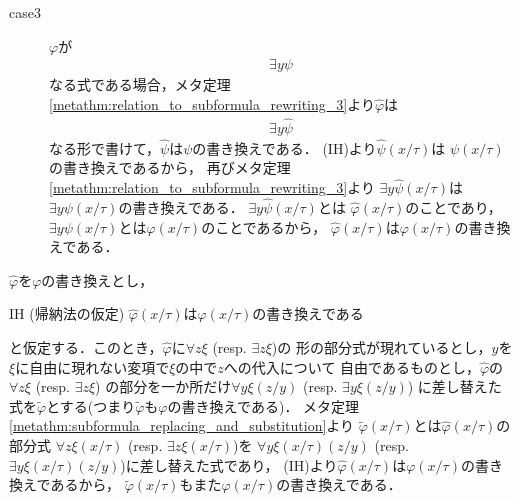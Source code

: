 \begin{metaprf}[第一]
\begin{description}
\begin{description}
					\item[case3] $\varphi$が
						\begin{align}
							\exists y \psi
						\end{align}
						なる式である場合，メタ定理\ref{metathm:relation_to_subformula_rewriting_3}より$\widehat{\varphi}$は
						\begin{align}
							\exists y \widehat{\psi}
						\end{align}
						なる形で書けて，$\widehat{\psi}$は$\psi$の書き換えである．
						(IH)より$\widehat{\psi}(x/\tau)$は
						$\psi(x/\tau)$の書き換えであるから，
						再びメタ定理\ref{metathm:relation_to_subformula_rewriting_3}より
						$\exists y \widehat{\psi}(x/\tau)$は
						$\exists y \psi(x/\tau)$の書き換えである．
						$\exists y \widehat{\psi}(x/\tau)$とは
						$\widehat{\varphi}(x/\tau)$のことであり，
						$\exists y \psi(x/\tau)$とは$\varphi(x/\tau)$のことであるから，
						$\widehat{\varphi}(x/\tau)$は$\varphi(x/\tau)$の書き換えである．
						\QED
				\end{description}
		\end{description}
	\end{metaprf}
	
	\begin{metaprf}[第二]
		$\widehat{\varphi}$を$\varphi$の書き換えとし，
		\begin{itembox}[l]{IH (帰納法の仮定)}
			$\widehat{\varphi}(x/\tau)$は$\varphi(x/\tau)$の書き換えである
		\end{itembox}
		と仮定する．このとき，$\widehat{\varphi}$に$\forall z \xi$ (resp. $\exists z \xi$)の
		形の部分式が現れているとし，$y$を$\xi$に自由に現れない変項で$\xi$の中で$z$への代入について
		自由であるものとし，$\widehat{\varphi}$の$\forall z \xi$ (resp. $\exists z \xi$)
		の部分を一か所だけ$\forall y \xi(z/y)$ (resp. $\exists y \xi(z/y)$)
		に差し替えた式を$\widetilde{\varphi}$とする(つまり$\widetilde{\varphi}$も$\varphi$の書き換えである)．
		メタ定理\ref{metathm:subformula_replacing_and_substitution}より
		$\widetilde{\varphi}(x/\tau)$とは$\widehat{\varphi}(x/\tau)$の部分式
		$\forall z \xi(x/\tau)$ (resp. $\exists z \xi(x/\tau)$)を
		$\forall y \xi(x/\tau)(z/y)$ (resp. $\exists y \xi(x/\tau)(z/y)$)に差し替えた式であり，
		(IH)より$\widehat{\varphi}(x/\tau)$は$\varphi(x/\tau)$の書き換えであるから，
		$\widetilde{\varphi}(x/\tau)$もまた$\varphi(x/\tau)$の書き換えである．
		\QED
	\end{metaprf}